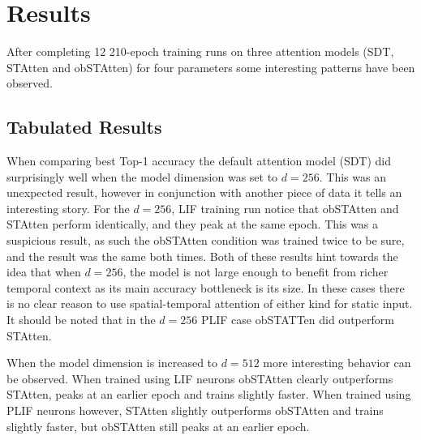 \documentclass[../main.tex]{subfiles}
\begin{document}
\section{Results}
\label{sec:res}
After completing 12 210-epoch training runs on three attention models (SDT, STAtten and obSTAtten) for four parameters some interesting patterns have been observed.

\subsection{Tabulated Results}
\label{sec:tabRes}
When comparing best Top-1 accuracy the default attention model (SDT) did surprisingly well when the model dimension was set to $d=256$. This was an unexpected result, however in conjunction with another piece of data it tells an interesting story. For the $d=256$, LIF training run notice that obSTAtten and STAtten perform identically, and they peak at the same epoch. This was a suspicious result, as such the obSTAtten condition was trained twice to be sure, and the result was the same both times. Both of these results hint towards the idea that when $d=256$, the model is not large enough to benefit from richer temporal context as its main accuracy bottleneck is its size. In these cases there is no clear reason to use spatial-temporal attention of either kind for static input. It should be noted that in the $d=256$ PLIF case obSTATTen did outperform STAtten.

\begin{table}[h]\centering
\caption{Dim-256 LIF Results}
\vspace{-0.75\baselineskip}
\small

\end{table}

\begin{table}[h]\centering
\caption{Dim-256 PLIF Results}
\vspace{-0.75\baselineskip}
\small

\end{table}

\par When the model dimension is increased to $d=512$ more interesting behavior can be observed. When trained using LIF neurons obSTAtten clearly outperforms STAtten, peaks at an earlier epoch and trains slightly faster. When trained using PLIF neurons however, STAtten slightly outperforms obSTAtten and trains slightly faster, but obSTAtten still peaks at an earlier epoch.

\begin{table}[h]\centering
\caption{Dim-512 LIF Results}
\vspace{-0.75\baselineskip}
\small

\end{table}
\end{document}
